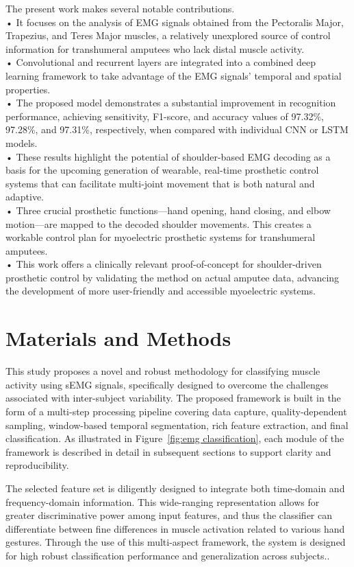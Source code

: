 \documentclass{elektr}
\begin{document}
The present work makes several notable contributions.\\
•	It focuses on the analysis of EMG signals obtained from the Pectoralis Major, Trapezius, and Teres Major muscles, a relatively unexplored source of control information for transhumeral amputees who lack distal muscle activity.\\
•	Convolutional and recurrent layers are integrated into a combined deep learning framework to take advantage of the EMG signals' temporal and spatial properties.\\
•	The proposed model demonstrates a substantial improvement in recognition performance, achieving sensitivity, F1-score, and accuracy values of 97.32\%, 97.28\%, and 97.31\%, respectively, when compared with individual CNN or LSTM models.\\
•	These results highlight the potential of shoulder-based EMG decoding as a basis for the upcoming generation of wearable, real-time prosthetic control systems that can facilitate multi-joint movement that is both natural and adaptive.\\
•	Three crucial prosthetic functions—hand opening, hand closing, and elbow motion—are mapped to the decoded shoulder movements. This creates a workable control plan for myoelectric prosthetic systems for transhumeral amputees.\\
•	This work offers a clinically relevant proof-of-concept for shoulder-driven prosthetic control by validating the method on actual amputee data, advancing the development of more user-friendly and accessible myoelectric systems.
\section{Materials and Methods}
This study proposes a novel and robust methodology for classifying muscle activity using sEMG signals, specifically designed to overcome the challenges associated with inter-subject variability.  The proposed  framework is built in the form of a multi-step processing pipeline covering data capture, quality-dependent sampling, window-based temporal segmentation, rich feature extraction, and final classification. As illustrated in Figure~\ref{fig:emg classification}, each module of the framework is described in detail in subsequent sections to support clarity and reproducibility.

The selected feature set is diligently designed to integrate both time-domain and frequency-domain information. This wide-ranging representation allows for greater discriminative power among input features, and thus the classifier can differentiate between fine differences in muscle activation related to various hand gestures. Through the use of this multi-aspect framework, the system is designed for high robust classification performance and generalization across subjects..
\end{document}
